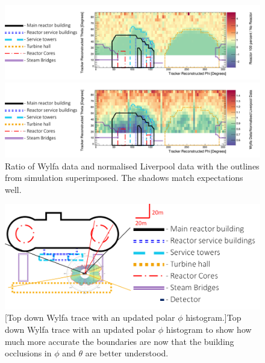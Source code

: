 \begin{figure}
  \centering
    \includegraphics[width=1\linewidth]{Chapter6/Figs/Raster/wylfaSimulatedShadowsWithKey.png}
    \caption[Ratio of simulated buildings (100\,\% concrete).]{Ratio of simulated buildings (100\,\% concrete) and no simulated buildings each component that leads to the composite shadow has been outlined with a key.}
  \label{fig:simulatedTrackerRecon}
    \includegraphics[width=1\linewidth]{Chapter6/Figs/Raster/wylfaMeasuredShadowsWithKey.png}
    \caption[Ratio of Wylfa data and normalised Liverpool data.]{Ratio of Wylfa data and normalised Liverpool data with the outlines from simulation superimposed. The shadows match expectations well.}
  \label{fig:measuredTrackerRecon}
\end{figure}

\clearpage

\begin{figure}[!h]
 \centering
 \includegraphics[width=\linewidth]{Chapter5/Figs/wylfaRasterNew/wylfaCircular0-37.5Deg_Overlay_Updated.png}
 [Top down Wylfa trace with an updated polar $\phi$ histogram.]{Top down Wylfa trace with an updated polar $\phi$ histogram to show how much more accurate the boundaries are now that the building occlusions in $\phi$ and $\theta$ are better understood.}  
 \label{fig:wylfaCircular0-37.5Deg_Overlay_Updated}
\end{figure}

